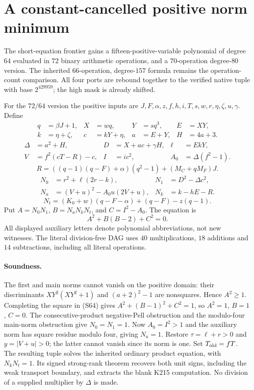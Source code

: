 \section{A constant-cancelled positive norm minimum}
The short-equation frontier gains a fifteen-positive-variable polynomial
of degree $64$ evaluated in $72$ binary arithmetic operations, and a
$70$-operation degree-$80$ version. The inherited $66$-operation,
degree-$157$ formula remains the operation-count comparison. All four
ports are rebound together to the verified native tuple with base
$2^{429959}$; the high mask is already shifted.

For the $72/64$ version the positive inputs are
$J,F,\alpha,z,f,h,i,T,s,w,r,\eta,\zeta,u,\gamma$. Define
\begin{align*}
 q&=\beta J+1,&X&=wq,&Y&=sq^3,&E&=XY,\\
 k&=\eta+\zeta,&c&=kY+\eta,&a&=E+Y,&H&=4a+3.
\end{align*}
\begin{align*}
 \Delta&=a^2+H,&D&=X+ac+\gamma H,&\ell&=EkY,\\
 V&=f^2(cT-R)-c,&I&=ic^2,&A_0&=\Delta(f^2-1).
\end{align*}
\[
 R=((q-1)(q-F)+\alpha)(q^2-1)+(M_C+qM_F)J.
\]
\begin{align*}
 N_0&=r^2+\ell(2r-k),&N_1&=D^2-\Delta c^2,\\
 N_a&=(V+u)^2-A_0u(2V+u),&N_k&=k-hE-R.
\end{align*}
\[
 N_t=(K_0+w)(q-F-\alpha)+(q-F)-z(q-1).
\]
Put $A=N_0N_1$, $B=N_aN_kN_t$, and $C=I^2-A_0$. The equation is
\[
                    A^2+B(B-2)+C^2=0.                 \tag{S64}
\]
All displayed auxiliary letters denote polynomial abbreviations, not new
witnesses. The literal division-free DAG uses $40$ multiplications,
$18$ additions and $14$ subtractions, including all literal operations.

\paragraph{Soundness.}
The first and main norms cannot vanish on the positive domain: their
discriminants $XY^2(XY^2+1)$ and $(a+2)^2-1$ are nonsquares. Hence
$A^2\geq1$. Completing the square in (S64) gives
$A^2+(B-1)^2+C^2=1$, so $A^2=1$, $B=1$, $C=0$.
The consecutive-product negative-Pell obstruction and the modulo-four
main-norm obstruction give $N_0=N_1=1$. Now $A_0=I^2>1$ and the
auxiliary norm has square residue modulo four, giving $N_a=1$.
Restore $\tau=\ell+r>0$ and $y=|V+u|>0$; the latter cannot vanish
since its norm is one. Set $T_{\rm old}=fT$. The resulting tuple solves
the inherited ordinary product equation, with $N_kN_t=1$. Its signed
strong-rank theorem recovers both unit signs, including the weak
transport boundary, and extracts the blank K215 computation. No division
of a supplied multiplier by $\Delta$ is made.

